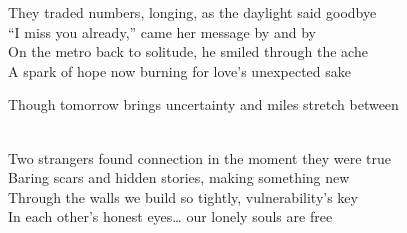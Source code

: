 \begin{lyrics}
They traded numbers, longing, as the daylight said goodbye\\
“I miss you already,” came her message by and by\\
On the metro back to solitude, he smiled through the ache\\
A spark of hope now burning for love’s unexpected sake

Though tomorrow brings uncertainty and miles stretch between

\\
Two strangers found connection in the moment they were true\\
Baring scars and hidden stories, making something new\\
Through the walls we build so tightly, vulnerability’s key\\
In each other’s honest eyes… our lonely souls are free

\end{lyrics}

